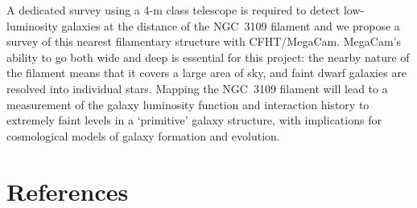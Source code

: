 A dedicated survey using a 4-m class telescope is required to detect low-luminosity galaxies at the distance of the NGC~3109 filament and 
we propose a survey  of this nearest filamentary structure with CFHT/MegaCam. MegaCam's ability to go both wide and deep is essential for this project: the nearby nature of the filament means that it covers a large area of sky, and faint dwarf galaxies are resolved into individual stars.
Mapping the NGC~3109 filament will lead to a measurement of the galaxy luminosity function and interaction history to extremely faint
levels in a `primitive' galaxy structure, with implications for cosmological models of galaxy formation and evolution.




\clearpage


\section*{References}


